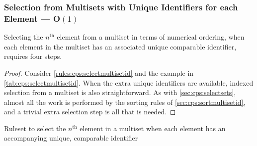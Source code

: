 \subsubsection{Selection from Multisets with Unique Identifiers for each Element --- O\((1)\)}\label{sec:cps:selectmultisetid}

\begin{proposition}\label{prop:cps:selectmultisetid}
Selecting the \(n^{\text{th}}\) element from a multiset in terms of numerical ordering, when each element in the multiset has an associated unique comparable identifier, requires four steps.
\end{proposition}

\begin{proof}
Consider \cref{rules:cps:selectmultisetid} and the example in \cref{tab:cps:selectmultisetid}.  When the extra unique identifiers are available, indexed selection from a multiset is also straightforward. As with \cref{sec:cps:selectsets}, almost all the work is performed by the sorting rules of \cref{sec:cps:sortmultisetid}, and a trivial extra selection step is all that is needed.
\end{proof}

\begin{cprulesetfloat} \begin{cpruleset}



\end{cpruleset}
\caption{\label{rules:cps:selectmultisetid}Ruleset to select the \(n^{\text{th}}\) element in a multiset when each element has an accompanying unique, comparable identifier}
\end{cprulesetfloat}

